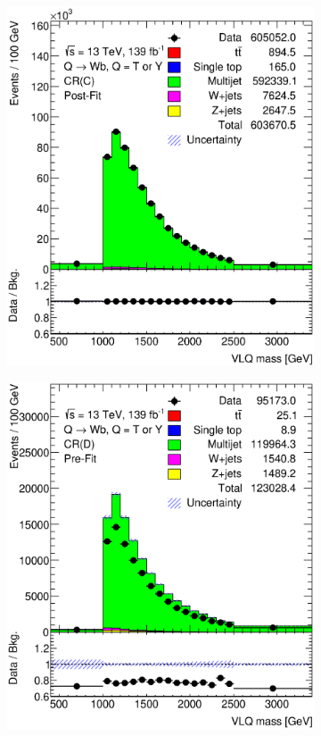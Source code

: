 \begin{figure}[hbt!]
\begin{subfigure}{.35\textwidth}
		\includegraphics[width=\linewidth,height=\textheight,keepaspectratio]{CR_C_VLQM_postFit.eps}
		\caption{}
	\end{subfigure}
	\begin{subfigure}{.35\textwidth}
		\centering
		\includegraphics[width=\linewidth,height=\textheight,keepaspectratio]{CR_D_VLQM.eps}

\end{subfigure}
\end{figure}
